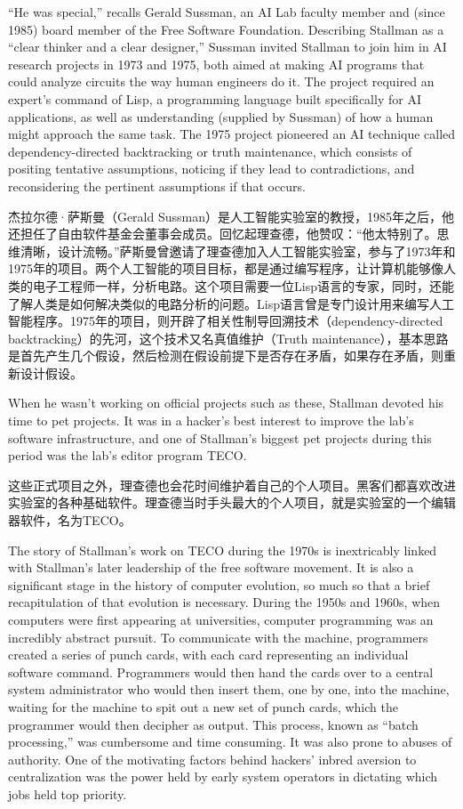 \ifdefined\eng
``He was special,'' recalls Gerald Sussman, an AI Lab faculty member and (since 1985) board member of the Free Software Foundation. Describing Stallman as a ``clear thinker and a clear designer,'' Sussman invited Stallman to join him in AI research projects in 1973 and 1975, both aimed at making AI programs that could analyze circuits the way human engineers do it. The project required an expert's command of Lisp, a programming language built specifically for AI applications, as well as understanding (supplied by Sussman) of how a human might approach the same task.  The 1975 project pioneered an AI technique called dependency-directed backtracking or truth maintenance, which consists of positing tentative assumptions, noticing if they lead to contradictions, and reconsidering the pertinent assumptions if that occurs.
\fi

\ifdefined\chs
杰拉尔德·萨斯曼（Gerald Sussman）是人工智能实验室的教授，1985年之后，他还担任了自由软件基金会董事会成员。回忆起理查德，他赞叹：“他太特别了。思维清晰，设计流畅。”萨斯曼曾邀请了理查德加入人工智能实验室，参与了1973年和1975年的项目。两个人工智能的项目目标，都是通过编写程序，让计算机能够像人类的电子工程师一样，分析电路。这个项目需要一位Lisp语言的专家，同时，还能了解人类是如何解决类似的电路分析的问题。Lisp语言曾是专门设计用来编写人工智能程序。1975年的项目，则开辟了相关性制导回溯技术（dependency-directed backtracking）的先河，这个技术又名真值维护（Truth maintenance），基本思路是首先产生几个假设，然后检测在假设前提下是否存在矛盾，如果存在矛盾，则重新设计假设。
\fi

\ifdefined\eng
When he wasn't working on official projects such as these, Stallman devoted his time to pet projects. It was in a hacker's best interest to improve the lab's software infrastructure, and one of Stallman's biggest pet projects during this period was the lab's editor program TECO.
\fi

\ifdefined\chs
这些正式项目之外，理查德也会花时间维护着自己的个人项目。黑客们都喜欢改进实验室的各种基础软件。理查德当时手头最大的个人项目，就是实验室的一个编辑器软件，名为TECO。
\fi

\ifdefined\eng
The story of Stallman's work on TECO during the 1970s is inextricably linked with Stallman's later leadership of the free software movement. It is also a significant stage in the history of computer evolution, so much so that a brief recapitulation of that evolution is necessary. During the 1950s and 1960s, when computers were first appearing at universities, computer programming was an incredibly abstract pursuit. To communicate with the machine, programmers created a series of punch cards, with each card representing an individual software command. Programmers would then hand the cards over to a central system administrator who would then insert them, one by one, into the machine, waiting for the machine to spit out a new set of punch cards, which the programmer would then decipher as output. This process, known as ``batch processing,'' was cumbersome and time consuming. It was also prone to abuses of authority. One of the motivating factors behind hackers' inbred aversion to centralization was the power held by early system operators in dictating which jobs held top priority.
\fi

